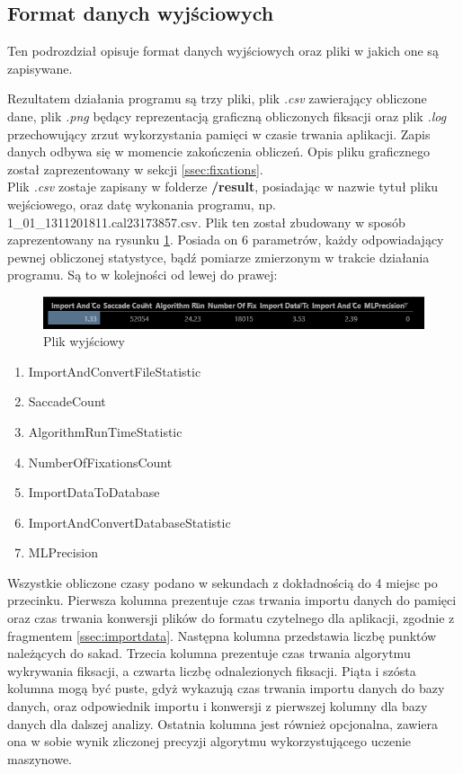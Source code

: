 \subsection{Format danych wyjściowych}
\label{ssec:exitdata}
Ten podrozdział opisuje format danych wyjściowych oraz pliki w jakich one są zapisywane.\par
Rezultatem działania programu są trzy pliki, plik \emph{.csv} zawierający obliczone dane, plik \emph{.png} będący reprezentacją graficzną obliczonych fiksacji oraz plik \emph{.log} przechowujący zrzut wykorzystania pamięci w czasie trwania aplikacji. Zapis danych odbywa się w momencie zakończenia obliczeń. Opis pliku graficznego został zaprezentowany w sekcji \ref{ssec:fixations}.\\
Plik \emph{.csv} zostaje zapisany w folderze \textbf{/result}, posiadając w nazwie tytuł pliku wejściowego, oraz datę wykonania programu, np. 1\_01\_1311201811.cal23\-173857.csv.
Plik ten został zbudowany w sposób zaprezentowany na rysunku \ref{fig:exportfile}. Posiada on 6 parametrów, każdy odpowiadający pewnej obliczonej statystyce, bądź pomiarze zmierzonym w trakcie działania programu. Są to w kolejności od lewej do prawej:
\begin{figure}[H]
        \centering
        \captionsetup{justification=centering,margin=2cm}
        \includegraphics[width=0.8\linewidth]{resources/exportfile.png}
        \caption{Plik wyjściowy}
        \label{fig:exportfile}
\end{figure}
\begin{enumerate}[itemsep=1pt] 
        \item ImportAndConvertFileStatistic
        \item SaccadeCount
        \item AlgorithmRunTimeStatistic
        \item NumberOfFixationsCount
        \item ImportDataToDatabase
        \item ImportAndConvertDatabaseStatistic
        \item MLPrecision
\end{enumerate}
Wszystkie obliczone czasy podano w sekundach z dokładnością do 4 miejsc po przecinku. Pierwsza kolumna prezentuje czas trwania importu danych do pamięci oraz czas trwania konwersji plików do formatu czytelnego dla aplikacji, zgodnie z fragmentem \ref{ssec:importdata}. Następna kolumna przedstawia liczbę punktów należących do sakad. Trzecia kolumna prezentuje czas trwania algorytmu wykrywania fiksacji, a czwarta liczbę odnalezionych fiksacji. Piąta i szósta kolumna mogą być puste, gdyż wykazują czas trwania importu danych do bazy danych, oraz odpowiednik importu i konwersji z pierwszej kolumny dla bazy danych dla dalszej analizy. Ostatnia kolumna jest również opcjonalna, zawiera ona w sobie wynik zliczonej precyzji algorytmu wykorzystującego uczenie maszynowe.\\
